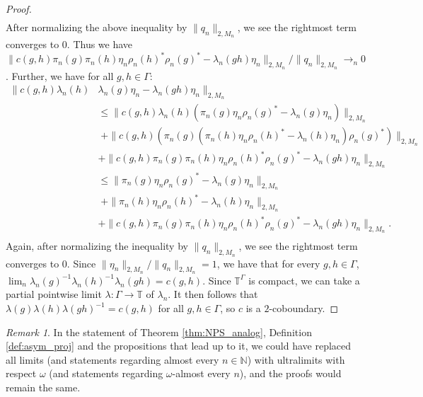 \documentclass[11pt]{amsart}
\newcommand{\T}{{\mathbb{T}}}
\newcommand{\N}{{\mathbb{N}}}
\theoremstyle{definition}
\theoremstyle{remark}
\newtheorem{remark}[theorem]{Remark}
\theoremstyle{definition}
\begin{document}
\begin{proof}
\begin{align*}
        \end{align*}
        After normalizing the above inequality by $\| q_n \|_{2,M_n}$, we see the rightmost term converges to $0$. Thus we  have $\| c(g,h)\pi_n(g)\pi_n(h)\eta_n \rho_n(h)^*\rho_n(g)^* - \lambda_n(gh) \eta_n \|_{2,M_n} / \| q_n \|_{2,M_n} \to_n 0$.
        Further, we have for all $g,h \in \Gamma$:
        \begin{align*}
             \| c(g,h)\lambda_n(h) &\lambda_n(g)\eta_n -\lambda_n(gh)\eta_n\|_{2,M_n}\\
             &\leq \| c(g,h)\lambda_n(h) (\pi_n(g) \eta_n \rho_n(g)^* - \lambda_n(g)\eta_n)\|_{2,M_n}\\ 
             &\;+ \| c(g,h) (\pi_n(g) (\pi_n(h) \eta_n \rho_n(h)^* - \lambda_n(h)\eta_n) \rho_n(g)^*)\|_{2,M_n}\\ 
            &+ \| c(g,h)\pi_n(g)\pi_n(h)\eta_n \rho_n(h)^*\rho_n(g)^* -\lambda_n(gh)\eta_n\|_{2,M_n}\\
            &\leq \|\pi_n(g) \eta_n \rho_n(g)^* - \lambda_n(g)\eta_n \|_{2,M_n}\\
            &\;+\|\pi_n(h) \eta_n \rho_n(h)^* - \lambda_n(h)\eta_n \|_{2,M_n}\\
            &+ \| c(g,h)\pi_n(g)\pi_n(h)\eta_n \rho_n(h)^*\rho_n(g)^* -\lambda_n(gh)\eta_n\|_{2,M_n}.\\
        \end{align*} 
        Again, after normalizing the inequality by $\| q_n \|_{2,M_n}$, we see the rightmost term converges to $0$. Since $\| \eta_n \|_{2,M_n} / \| q_n\|_{2,M_n} = 1$, we have that for every $g,h \in \Gamma$, $\lim_n \lambda_n(g)^{-1}\lambda_n(h)^{-1} \lambda_n(gh) = c(g,h)$. 
        Since $\T^\Gamma$ is compact, we can take a partial pointwise limit $\lambda: \Gamma \to \T$ of $\lambda_n$.
        It then follows that $\lambda(g) \lambda(h) \lambda(gh)^{-1} = c(g,h)$ for all $g,h \in \Gamma$, so $c$ is a $2$-coboundary.
        \end{proof}
\begin{remark}\label{rem:asymp_rig_ult}
    In the statement of Theorem \ref{thm:NPS_analog}, Definition \ref{def:asym_proj} and the propositions that lead up to it, we could have replaced all limits (and statements regarding almost every $n \in \N$) with ultralimits with respect $\omega$ (and statements regarding $\omega$-almost every $n$), and the proofs would remain the same.
\end{remark}
\end{document}

